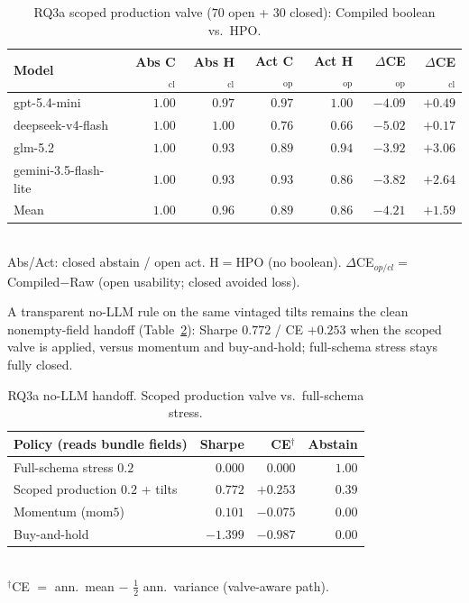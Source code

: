 \documentclass[sigconf,anonymous]{acmart}
\theoremstyle{acmdefinition}%
\theoremstyle{acmplain}%
\begin{document}
\begin{table}[t]
  \caption{RQ3a scoped production valve ($70$ open + $30$ closed): Compiled boolean vs.\ HPO.}
  \label{tab:scopedllm}
  \scriptsize
  \setlength{\tabcolsep}{2.8pt}
  \begin{tabular}{@{}lrrrrrr@{}}
    \toprule
    Model & Abs C$_\mathrm{cl}$ & Abs H$_\mathrm{cl}$ & Act C$_\mathrm{op}$ & Act H$_\mathrm{op}$ & $\Delta$CE$_\mathrm{op}$ & $\Delta$CE$_\mathrm{cl}$ \\
    \midrule
    gpt-5.4-mini & $1.00$ & $0.97$ & $0.97$ & $1.00$ & $-4.09$ & $+0.49$ \\
    deepseek-v4-flash & $1.00$ & $1.00$ & $0.76$ & $0.66$ & $-5.02$ & $+0.17$ \\
    glm-5.2 & $1.00$ & $0.93$ & $0.89$ & $0.94$ & $-3.92$ & $+3.06$ \\
    gemini-3.5-flash-lite & $1.00$ & $0.93$ & $0.93$ & $0.86$ & $-3.82$ & $+2.64$ \\
    \midrule
    Mean & $1.00$ & $0.96$ & $0.89$ & $0.86$ & $-4.21$ & $+1.59$ \\
    \bottomrule
  \end{tabular}\\[-2pt]
  {\scriptsize Abs/Act: closed abstain / open act. H$=$HPO (no boolean). $\Delta$CE$_{op/cl}=$ Compiled$-$Raw (open usability; closed avoided loss).}
\end{table}

A transparent no-LLM rule on the same vintaged tilts remains the clean nonempty-field handoff (Table~\ref{tab:handoff}): Sharpe \(0.772\) / CE \({+}0.253\) when the scoped valve is applied, versus momentum and buy-and-hold; full-schema stress stays fully closed.

\begin{table}[t]
  \caption{RQ3a no-LLM handoff. Scoped production valve vs.\ full-schema stress.}
  \label{tab:handoff}
  \small
  \begin{tabular}{lrrr}
    \toprule
    Policy (reads bundle fields) & Sharpe & CE$^\dagger$ & Abstain \\
    \midrule
    Full-schema stress \(0.2\) & $0.000$ & $0.000$ & $1.00$ \\
    Scoped production \(0.2\) + tilts & $\mathbf{0.772}$ & $\mathbf{+0.253}$ & $0.39$ \\
    Momentum (\(\mathrm{mom5}\)) & $0.101$ & $-0.075$ & $0.00$ \\
    Buy-and-hold & $-1.399$ & $-0.987$ & $0.00$ \\
    \bottomrule
  \end{tabular}\\[-2pt]
  {\scriptsize $^\dagger$CE $=$ ann.\ mean $-$ $\tfrac12$ ann.\ variance (valve-aware path).}
\end{table}
\end{document}

